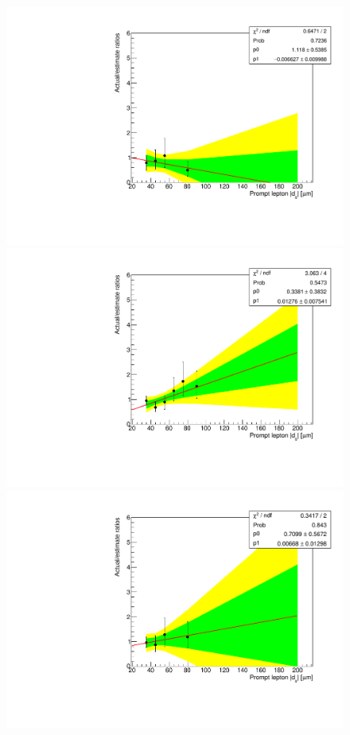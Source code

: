 
\begin{figure}[hbtp]
\centering
\includegraphics[scale=0.35]{figures/bg/emu_data_2016_displacedMuon_ratiosVsPromptD0.pdf}
\includegraphics[scale=0.35]{figures/bg/emu_data_2017_2018_displacedMuon_ratiosVsPromptD0.pdf}
\includegraphics[scale=0.35]{figures/bg/emu_data_2016_displacedElectron_ratiosVsPromptD0.pdf}

\end{figure}
